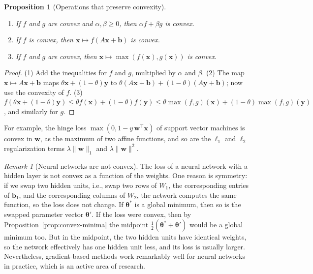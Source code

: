 \documentclass[11pt]{article}
\newcommand{\norm}[1]{\lVert #1 \rVert}
\theoremstyle{definition}
\theoremstyle{plain}
\newtheorem{proposition}[definition]{Proposition}
\theoremstyle{remark}
\newtheorem{remark}[definition]{Remark}
\begin{document}
\begin{proposition}[Operations that preserve convexity]\label{prop:convex-operations}
    \begin{enumerate}
        \item If $f$ and $g$ are convex and $\alpha, \beta \geq 0$, then $\alpha f + \beta g$ is convex.
        \item If $f$ is convex, then $\mathbf{x} \mapsto f(A\mathbf{x} + \mathbf{b})$ is convex.
        \item If $f$ and $g$ are convex, then $\mathbf{x} \mapsto \max(f(\mathbf{x}), g(\mathbf{x}))$ is convex.
    \end{enumerate}
\end{proposition}

\begin{proof}
    (1) Add the inequalities for $f$ and $g$, multiplied by $\alpha$ and $\beta$. (2) The map $\mathbf{x} \mapsto A\mathbf{x} + \mathbf{b}$ maps $\theta\mathbf{x} + (1 - \theta)\mathbf{y}$ to $\theta(A\mathbf{x} + \mathbf{b}) + (1 - \theta)(A\mathbf{y} + \mathbf{b})$; now use the convexity of $f$. (3) $f(\theta\mathbf{x} + (1 - \theta)\mathbf{y}) \leq \theta f(\mathbf{x}) + (1 - \theta)f(\mathbf{y}) \leq \theta\max(f, g)(\mathbf{x}) + (1 - \theta)\max(f, g)(\mathbf{y})$, and similarly for $g$.
\end{proof}

For example, the hinge loss $\max(0, 1 - y\,\mathbf{w}^\top\mathbf{x})$ of support vector machines is convex in $\mathbf{w}$, as the maximum of two affine functions, and so are the $\ell_1$ and $\ell_2$ regularization terms $\lambda\norm{\mathbf{w}}_1$ and $\lambda\norm{\mathbf{w}}^2$.

\begin{remark}[Neural networks are not convex]
    The loss of a neural network with a hidden layer is not convex as a function of the weights. One reason is symmetry: if we swap two hidden units, i.e., swap two rows of $W_1$, the corresponding entries of $\mathbf{b}_1$, and the corresponding columns of $W_2$, the network computes the same function, so the loss does not change. If $\boldsymbol{\theta}^*$ is a global minimum, then so is the swapped parameter vector $\boldsymbol{\theta}'$. If the loss were convex, then by Proposition~\ref{prop:convex-minima} the midpoint $\frac{1}{2}(\boldsymbol{\theta}^* + \boldsymbol{\theta}')$ would be a global minimum too. But in the midpoint, the two hidden units have identical weights, so the network effectively has one hidden unit less, and its loss is usually larger. Nevertheless, gradient-based methods work remarkably well for neural networks in practice, which is an active area of research.
\end{remark}
\end{document}

